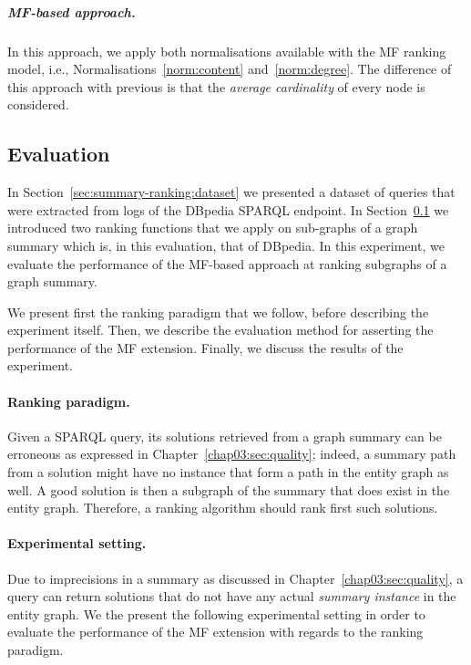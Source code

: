 
\subparagraph{MF-based approach.}

In this approach, we apply both normalisations available with the MF ranking model, i.e., Normalisations~\ref{norm:content} and~\ref{norm:degree}. The difference of this approach with previous is that the \emph{average cardinality} of every node is considered.

\subsection{Evaluation}
\label{sec:summary-ranking:eval}

In Section~\ref{sec:summary-ranking:dataset} we presented a dataset of queries that were extracted from logs of the DBpedia SPARQL endpoint. In Section~\ref{sec:summary-ranking:eval} we introduced two ranking functions that we apply on sub-graphs of a graph summary which is, in this evaluation, that of DBpedia.
In this experiment, we evaluate the performance of the MF-based approach at ranking subgraphs of a graph summary.

We present first the ranking paradigm that we follow, before describing the experiment itself. Then, we describe the evaluation method for asserting the performance of the MF extension. Finally, we discuss the results of the experiment.

\paragraph{Ranking paradigm.}

Given a SPARQL query, its solutions retrieved from a graph summary can be erroneous as expressed in Chapter~\ref{chap03:sec:quality}; indeed, a summary path from a solution might have no instance that form a path in the entity graph as well. A good solution is then a subgraph of the summary that does exist in the entity graph. Therefore, a ranking algorithm should rank first such solutions.

\paragraph{Experimental setting.}

Due to imprecisions in a summary as discussed in Chapter~\ref{chap03:sec:quality}, a query can return solutions that do not have any actual \emph{summary instance} in the entity graph. We the present the following experimental setting in order to evaluate the performance of the MF extension with regards to the ranking paradigm.\\

